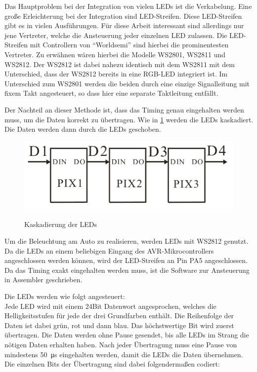 Das Hauptproblem bei der Integration von vielen LEDs ist die Verkabelung. Eine große Erleichterung bei der Integration sind 
LED-Streifen. Diese LED-Streifen gibt es in vielen Ausführungen. Für diese Arbeit interessant sind allerdings nur jene Vertreter, welche die Ansteuerung
jeder einzelnen LED zulassen. Die LED-Streifen mit Controllern von ``Worldsemi'' sind hierbei die prominentesten Vertreter. Zu erwähnen wären hierbei die Modelle
WS2801, WS2811 und WS2812. Der WS2812 ist dabei nahezu identisch mit dem WS2811 mit dem Unterschied, dass der WS2812 bereits in eine RGB-LED integriert ist.
Im Unterschied zum WS2801 werden die beiden durch eine einzige Signalleitung mit fixem Takt angesteuert, so dass hier eine separate Taktleitung entfällt.

Der Nachteil an dieser Methode ist, dass das Timing genau eingehalten werden muss, um die Daten korrekt zu übertragen. Wie in \cref{fig:led_cascade} werden die 
LEDs kaskadiert. Die Daten werden dann durch die LEDs geschoben.

\begin{figure}[H]
\centering
\includegraphics[width=.8\textwidth]{led_cascade.png}\\
\caption{Kaskadierung der LEDs \cite{ds-WS2812}}%
\label{fig:led_cascade}
\end{figure}

Um die Beleuchtung am Auto zu realisieren, werden LEDs mit WS2812 genutzt. Da die LEDs an einem beliebigen
Eingang des AVR-Mikro\-con\-trol\-lers angeschlossen werden können, wird der LED-Streifen an Pin PA5 angeschlossen. Da das Timing 
exakt eingehalten werden muss, ist die Software zur Ansteuerung in Assembler geschrieben.

Die LEDs werden wie folgt angesteuert:\\
Jede LED wird mit einem 24Bit Datenwort angesprochen, welches die Helligkeitsstufen für jede der drei Grundfarben enthält. 
Die Reihenfolge der Daten ist dabei grün, rot und dann blau. Das höchstwertige Bit wird zuerst übertragen.
Die Daten werden ohne Pause gesendet, bis alle LEDs im Strang die nötigen Daten erhalten haben. Nach jeder Übertragung muss eine Pause von mindestens \SI{50}{\micro\second} eingehalten
werden, damit die LEDs die Daten übernehmen. Die einzelnen Bits der Übertragung sind dabei folgendermaßen codiert:

